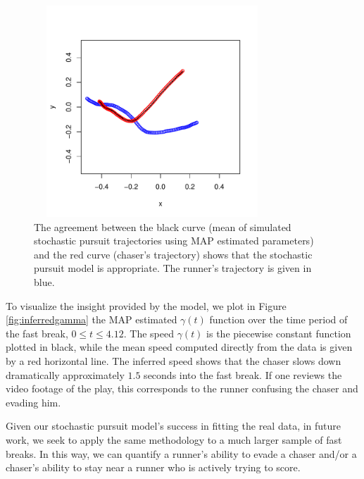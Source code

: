 \documentclass[graybox]{svmult}
\begin{document}
\begin{figure}
\vspace{-0.6in}
\begin{center}
\includegraphics[width=3.5in,height=3.125in]{nbaspatial}
\end{center}
\vspace{-0.25in}
\caption{The agreement between the black curve (mean of simulated
  stochastic pursuit trajectories using MAP estimated parameters) and
  the red curve (chaser's trajectory) shows that the stochastic
  pursuit model is appropriate.  The runner's trajectory is given in blue.}
\label{fig:nbaspatial}
\end{figure}

To visualize the insight provided by the model, we plot in Figure
\ref{fig:inferredgamma} the MAP
estimated $\gamma(t)$ function over the time period of the fast break,
$0 \leq t \leq 4.12$.  The speed $\gamma(t)$ is the piecewise constant
function plotted in black, while the mean speed computed directly from
the data is given by a red horizontal line.  The inferred speed shows
that the chaser slows down dramatically approximately $1.5$ seconds
into the fast break.  If one reviews the video footage of the play,
this corresponds to the runner confusing the chaser and evading him.

Given our stochastic pursuit model's success in fitting the real data,
in future work, we seek to apply the same methodology to a much larger
sample of fast breaks.  In this way, we can quantify a runner's
ability to evade a chaser and/or a chaser's ability to stay near a
runner who is actively trying to score.
\end{document}
